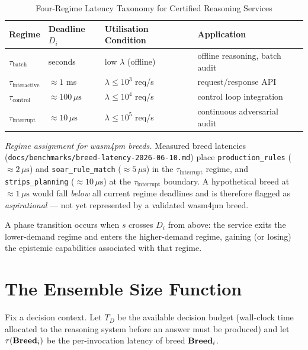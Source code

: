 \begin{table}[ht]
\centering
\caption{Four-Regime Latency Taxonomy for Certified Reasoning Services}
\label{tab:latency-regimes}
\begin{tabular}{llll}
\hline
\textbf{Regime} & \textbf{Deadline $D_i$} & \textbf{Utilisation Condition} & \textbf{Application} \\
\hline
$\tau_{\text{batch}}$       & seconds         & low $\lambda$ (offline)           & offline reasoning, batch audit \\
$\tau_{\text{interactive}}$ & $\approx 1$ ms  & $\lambda \leq 10^3$ req/s         & request/response API \\
$\tau_{\text{control}}$     & $\approx 100\,\mu\text{s}$ & $\lambda \leq 10^4$ req/s & control loop integration \\
$\tau_{\text{interrupt}}$   & $\approx 10\,\mu\text{s}$  & $\lambda \leq 10^5$ req/s & continuous adversarial audit \\
\hline
\end{tabular}
\end{table}

\noindent
\emph{Regime assignment for wasm4pm breeds.}  Measured breed latencies
(\texttt{docs/benchmarks/breed-latency-2026-06-10.md}) place
\texttt{production\_rules} ($\approx 2\,\mu\text{s}$) and
\texttt{soar\_rule\_match} ($\approx 5\,\mu\text{s}$) in the
$\tau_{\text{interrupt}}$ regime, and \texttt{strips\_planning}
($\approx 10\,\mu\text{s}$) at the $\tau_{\text{interrupt}}$ boundary.
A hypothetical breed at $\approx 1\,\mu\text{s}$ would fall \emph{below} all current
regime deadlines and is therefore flagged as \emph{aspirational} --- not yet represented
by a validated wasm4pm breed.

A phase transition occurs when $s$ crosses $D_i$ from above: the service exits the
lower-demand regime and enters the higher-demand regime, gaining (or losing) the
epistemic capabilities associated with that regime.

\section{The Ensemble Size Function}
\label{sec:ensemble-size}

Fix a decision context.  Let $T_D$ be the available decision budget (wall-clock time
allocated to the reasoning system before an answer must be produced) and let
$\tau(\mathbf{Breed}_i)$ be the per-invocation latency of breed $\mathbf{Breed}_i$.

